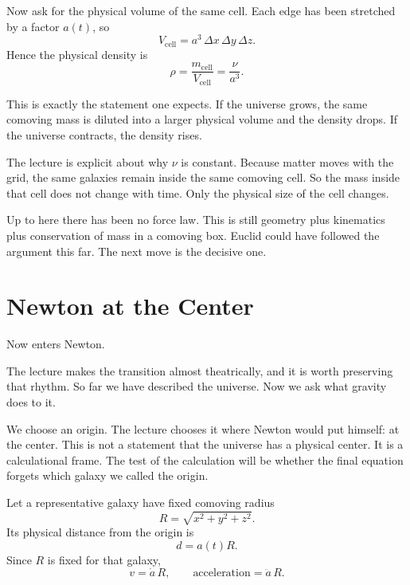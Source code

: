 Now ask for the physical volume of the same cell. Each edge has been stretched by a factor \(a(t)\), so
\begin{equation}
V_{\text{cell}}=a^3\,\Delta x\,\Delta y\,\Delta z.
\end{equation}
Hence the physical density is
\begin{equation}
\rho=\frac{m_{\text{cell}}}{V_{\text{cell}}}=\frac{\nu}{a^3}.
\end{equation}

This is exactly the statement one expects. If the universe grows, the same comoving mass is diluted into a larger physical volume and the density drops. If the universe contracts, the density rises.

The lecture is explicit about why \(\nu\) is constant. Because matter moves with the grid, the same galaxies remain inside the same comoving cell. So the mass inside that cell does not change with time. Only the physical size of the cell changes.

Up to here there has been no force law. This is still geometry plus kinematics plus conservation of mass in a comoving box. Euclid could have followed the argument this far. The next move is the decisive one.

\section{Newton at the Center}

Now enters Newton.

The lecture makes the transition almost theatrically, and it is worth preserving that rhythm. So far we have described the universe. Now we ask what gravity does to it.

We choose an origin. The lecture chooses it where Newton would put himself: at the center. This is not a statement that the universe has a physical center. It is a calculational frame. The test of the calculation will be whether the final equation forgets which galaxy we called the origin.

Let a representative galaxy have fixed comoving radius
\begin{equation}
R=\sqrt{x^2+y^2+z^2}.
\end{equation}
Its physical distance from the origin is
\begin{equation}
d=a(t)R.
\end{equation}
Since \(R\) is fixed for that galaxy,
\begin{equation}
v=\dot a\,R,\qquad \text{acceleration}=\ddot a\,R.
\end{equation}

